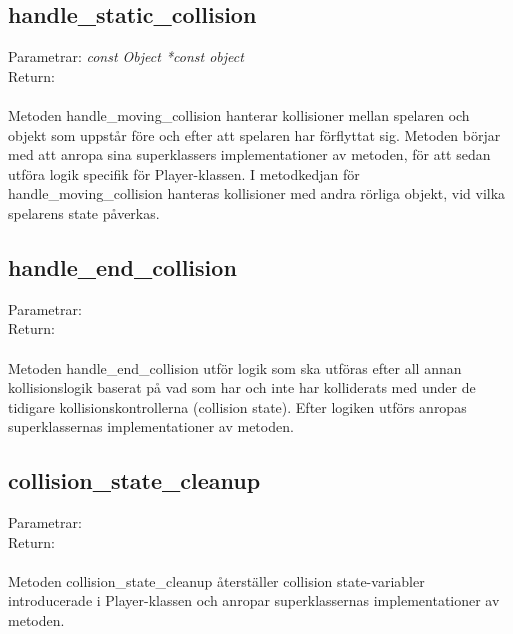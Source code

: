 \documentclass{TDP003mall}
\begin{document}
\subsection{handle\_static\_collision}
Parametrar: \textit{const Object *const object}
\\Return: \textit{}
\\\\
Metoden handle\_moving\_collision hanterar kollisioner mellan spelaren och objekt som uppstår före och efter att spelaren har förflyttat sig. Metoden börjar med att anropa sina superklassers implementationer av metoden, för att sedan utföra logik specifik för Player-klassen. I metodkedjan för handle\_moving\_collision hanteras kollisioner med andra rörliga objekt, vid vilka spelarens state påverkas.

\subsection{handle\_end\_collision}
Parametrar: \textit{}
\\Return: \textit{}
\\\\
Metoden handle\_end\_collision utför logik som ska utföras efter all annan kollisionslogik baserat på vad som har och inte har kolliderats med under de tidigare kollisionskontrollerna (collision state). Efter logiken utförs anropas superklassernas implementationer av metoden.

\subsection{collision\_state\_cleanup}
Parametrar: \textit{}
\\Return: \textit{}
\\\\
Metoden collision\_state\_cleanup återställer collision state-variabler introducerade i Player-klassen och anropar superklassernas implementationer av metoden.
\end{document}
